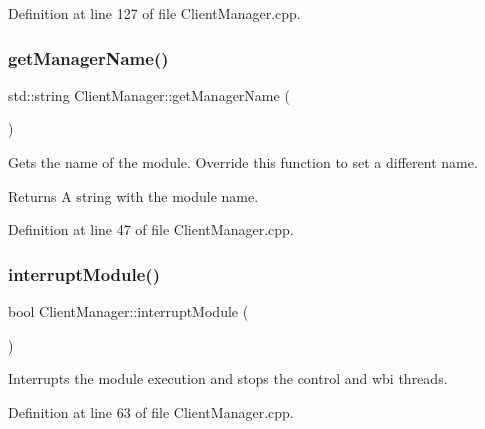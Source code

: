 Definition at line 127 of file Client\+Manager.\+cpp.

\hypertarget{classocra__recipes_1_1ClientManager_a3fd7aa39812c9ffdb32b732c4f854862}{}\label{classocra__recipes_1_1ClientManager_a3fd7aa39812c9ffdb32b732c4f854862} 
\subsubsection{\texorpdfstring{get\+Manager\+Name()}{getManagerName()}}
{\footnotesize\ttfamily std\+::string Client\+Manager\+::get\+Manager\+Name (\begin{DoxyParamCaption}{ }\end{DoxyParamCaption})\hspace{0.3cm}{\ttfamily [virtual]}}

Gets the name of the module. Override this function to set a different name. \begin{DoxyReturn}{Returns}
A string with the module name. 
\end{DoxyReturn}


Definition at line 47 of file Client\+Manager.\+cpp.

\hypertarget{classocra__recipes_1_1ClientManager_a3724b1ba55a2a0e81774aa674f567e34}{}\label{classocra__recipes_1_1ClientManager_a3724b1ba55a2a0e81774aa674f567e34} 
\subsubsection{\texorpdfstring{interrupt\+Module()}{interruptModule()}}
{\footnotesize\ttfamily bool Client\+Manager\+::interrupt\+Module (\begin{DoxyParamCaption}{ }\end{DoxyParamCaption})}

Interrupts the module execution and stops the control and wbi threads. 

Definition at line 63 of file Client\+Manager.\+cpp.

\hypertarget{classocra__recipes_1_1ClientManager_a443fb4edc4bac1c1e24e32f26a730519}{}\label{classocra__recipes_1_1ClientManager_a443fb4edc4bac1c1e24e32f26a730519} 
